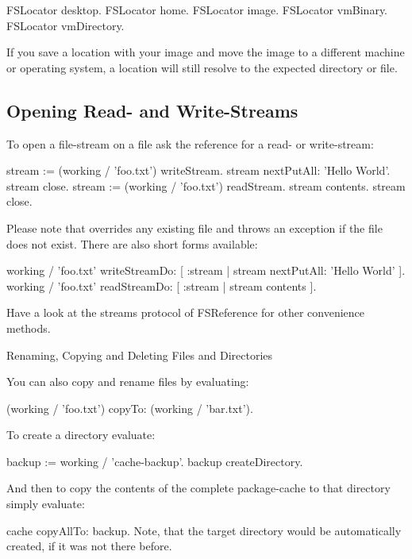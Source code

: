 \documentclass[a4paper,10pt,twoside]{book}
\begin{document}
\begin{code}{}
 FSLocator desktop.
 FSLocator home.
 FSLocator image.
 FSLocator vmBinary.
 FSLocator vmDirectory.
\end{code} 

If you save a location with your image and move the image to a different machine or operating system, a location will still resolve to the expected directory or file.

\subsection{Opening Read- and Write-Streams}

To open a file-stream on a file ask the reference for a read- or write-stream:

\begin{code}{}
 stream := (working / 'foo.txt') writeStream.
 stream nextPutAll: 'Hello World'.
 stream close.
 stream := (working / 'foo.txt') readStream.
 stream contents.
 stream close.
\end{code}

Please note that  overrides any existing file and  throws an exception if the file does not exist. There are also short forms available:

\begin{code}{}
 working / 'foo.txt' writeStreamDo: [ :stream | stream nextPutAll: 'Hello World' ].
 working / 'foo.txt' readStreamDo: [ :stream | stream contents ].
\end{code}

Have a look at the streams protocol of FSReference for other convenience methods.

Renaming, Copying and Deleting Files and Directories

You can also copy and rename files by evaluating:

\begin{code}{}
 (working / 'foo.txt') copyTo: (working / 'bar.txt').
\end{code} 

To create a directory evaluate:
\begin{code}{}
 backup := working / 'cache-backup'.
 backup createDirectory.
\end{code} 

And then to copy the contents of the complete package-cache to that directory simply evaluate:

 cache copyAllTo: backup.
Note, that the target directory would be automatically created, if it was not there before.
\end{document}
